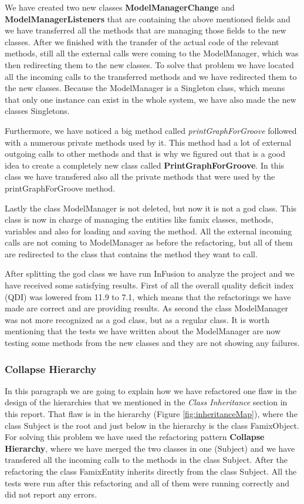 \documentclass[a4paper]{article}
\begin{document}
We have created two new classes \textbf{ModelManagerChange} and \textbf{ModelManagerListeners} that are containing the above mentioned fields and we have transferred all the methods that are managing those fields to the new classes. After we finished with the transfer of the actual code of the relevant methods, still all the external calls were coming to the ModelManager, which was then redirecting them to the new classes. To solve that problem we have located all the incoming calls to the transferred methods and we have redirected them to the new classes. Because the ModelManager is a Singleton class, which means that only one instance can exist in the whole system, we have also made the new classes Singletons.

Furthermore, we have noticed a big method called \emph{printGraphForGroove} followed with a numerous private methods used by it. This method had a lot of external outgoing calls to other methods and that is why we figured out that is a good idea to create a completely new class called \textbf{PrintGraphForGroove}. In this class we have transfered also all the private methods that were used by the printGraphForGroove method.

Lastly the class ModelManager is not deleted, but now it is not a god class. This class is now in charge of managing the entities like famix classes, methods, variables and also for loading and saving the method. All the external incoming calls are not coming to ModelManager as before the refactoring, but all of them are redirected to the class that contains the method they want to call.

After splitting the god class we have run InFusion to analyze the project and we have received some satisfying results. First of all the overall quality deficit index (QDI) was lowered from 11.9 to 7.1, which means that the refactorings we have made are correct and are providing results. As second the class ModelManager was not more recognized as a god class, but as a regular class. It is worth mentioning that the tests we have written about the ModelManager are now testing some methods from the new classes and they are not showing any failures.

\subsubsection{Collapse Hierarchy \cite{sourcemaking}}
In this paragraph we are going to explain how we have refactored one flaw in the design of the hierarchies that we mentioned in the \emph{Class Inheritance} section in this report. That flaw is in the hierarchy (Figure \ref{fig:inheritanceMap}), where the class Subject is the root and just below in the hierarchy is the class FamixObject. For solving this problem we have used the refactoring pattern \textbf{Collapse Hierarchy}, where we have merged the two classes in one (Subject) and we have transfered all the incoming calls to the methods in the class Subject. After the refactoring the class FamixEntity inherits directly from the class Subject. All the tests were run after this refactoring and all of them were running correctly and did not report any errors.
\end{document}
